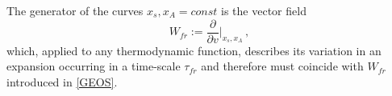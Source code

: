 \documentclass[useAMS,usenatbib,prd,twocolumn,nofootinbib]{revtex4-1}
\begin{document}
The generator of the curves $x_s,x_{A}=const$ is the vector field
\begin{equation}
W_{fr} := \dfrac{\partial}{\partial v} \bigg|_{x_s,x_A} \, ,
\end{equation}
which, applied to any thermodynamic function, describes its variation in an expansion occurring in a time-scale $\tau_{fr}$ and therefore must coincide with $W_{fr}$ introduced in \eqref{GEOS}. 


\end{document}
